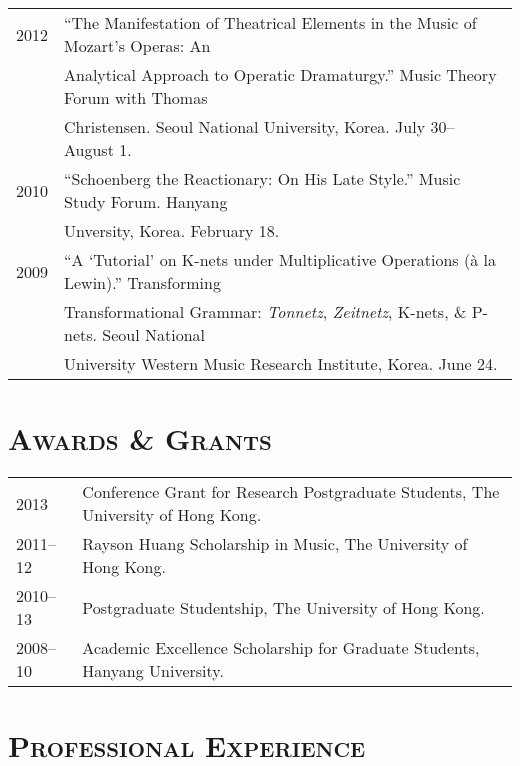 \documentclass[a4paper,11pt]{article}
\begin{document}
  \hspace*{-0.25cm}
  \begin{tabular}{p{2.5cm} p{12.5cm}}
  2012 & “The Manifestation of Theatrical Elements in the Music of Mozart’s Operas: An\\
  & Analytical Approach to Operatic Dramaturgy.” Music Theory Forum with Thomas\\
  & Christensen. Seoul National University, Korea. July 30–August 1.\\[2mm]

  2010 & “Schoenberg the Reactionary: On His Late Style.” Music Study Forum. Hanyang\\
  & Unversity, Korea. February 18.\\[2mm]
  
  2009 & “A ‘Tutorial’ on K-nets under Multiplicative Operations (à la Lewin).” Transforming\\
  & Transformational Grammar: \textit{Tonnetz}, \textit{Zeitnetz}, K-nets, \& P-nets. Seoul National\\
  & University Western Music Research Institute, Korea. June 24.
  \end{tabular}
  
  \vspace{2.5mm}
  
  \section*{\textsc{Awards \& Grants}}
  
  \hspace*{-0.25cm}
  \begin{tabular}{p{2.5cm} l}
    2013 & Conference Grant for Research Postgraduate Students, The University of Hong Kong.\\
    2011–12 & Rayson Huang Scholarship in Music, The University of Hong Kong.\\
    2010–13 & Postgraduate Studentship, The University of Hong Kong.\\
    2008–10 & Academic Excellence Scholarship for Graduate Students, Hanyang University.
  \end{tabular}
  
  \vspace{2.5mm}
  
  \section*{\textsc{Professional Experience}}
  
\end{document}
